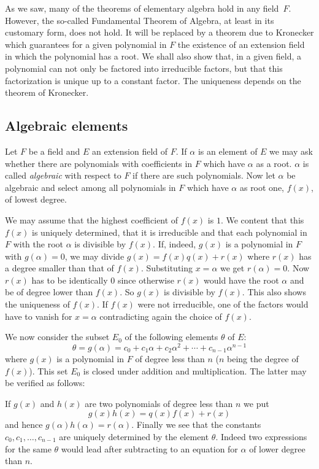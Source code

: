 \documentclass[11pt]{article}
\theoremstyle{definition}
\begin{document}
As we saw, many of the theorems of elementary algebra hold in any field~$F$.
However, the so-called Fundamental Theorem of Algebra, at least in its customary form, does not hold.
It will be replaced by a theorem due to Kronecker which guarantees for a given polynomial in $F$ the existence of an extension field in which the polynomial has a root.
We shall also show that, in a given field, a polynomial can not only be factored into irreducible factors, but that this factorization is unique up to a constant factor.
The uniqueness depends on the theorem of Kronecker.


\subsection{Algebraic elements}

Let $F$ be a field and $E$ an extension field of $F$.
If $\alpha$ is an element of $E$ we may ask whether there are polynomials with coefficients in $F$ which have $\alpha$ as a root.
$\alpha$ is called \emph{algebraic} with respect to $F$ if there are such polynomials.
Now let $\alpha$ be algebraic and select among all polynomials in $F$ which have $\alpha$ as root one, $f(x)$, of lowest degree.

We may assume that the highest coefficient of $f(x)$ is $1$.
We content that this $f(x)$ is uniquely determined, that it is irreducible and that each polynomial in $F$ with the root $\alpha$ is divisible by $f(x)$.
If, indeed, $g(x)$ is a polynomial in $F$ with $g(\alpha) = 0$, we may divide $g(x) = f(x) q(x) + r(x)$ where $r(x)$ has a degree smaller than that of $f(x)$.
\label{p25}%
Substituting $x = \alpha$ we get $r(\alpha) = 0$.
Now $r(x)$ has to be identically $0$ since otherwise $r(x)$ would have the root $\alpha$ and be of degree lower than $f(x)$.
So $g(x)$ is divisible by $f(x)$.
This also shows the uniqueness of $f(x)$.
If $f(x)$ were not irreducible, one of the factors would have to vanish for $x = \alpha$ contradicting again the choice of $f(x)$.

We now consider the subset $E_0$ of the following elements $\theta$ of $E$:
\[
\theta = g(\alpha) = c_0 + c_1\alpha + c_2\alpha^2 + \cdots + c_{n-1} \alpha^{n-1}
\]
where $g(x)$ is a polynomial in $F$ of degree less than $n$ ($n$ being the degree of $f(x)$).
This set $E_0$ is closed under addition and multiplication.
The latter may be verified as follows:

If $g(x)$ and $h(x)$ are two polynomials of degree less than $n$ we put 
\[
g(x) h(x) = q(x) f(x) + r(x)
\]
and hence $g(\alpha) h(\alpha) = r(\alpha)$.
Finally we see that the constants $c_0, c_1, \ldots, c_{n-1}$ are uniquely determined by the element $\theta$.
Indeed two expressions for the same $\theta$ would lead after subtracting to an equation for $\alpha$ of lower degree than $n$.
\end{document}
